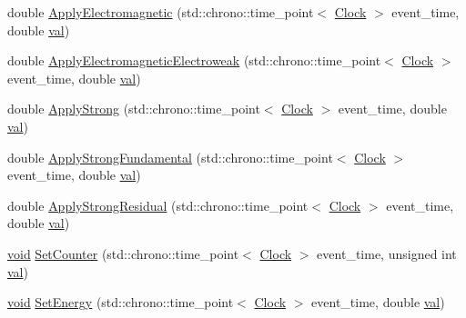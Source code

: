 \begin{DoxyCompactItemize}
\item 
double \mbox{\hyperlink{class_elementary_force_a0045a3380e468c6cfdbefce829888c1f}{Apply\+Electromagnetic}} (std\+::chrono\+::time\+\_\+point$<$ \mbox{\hyperlink{universe_8h_a0ef8d951d1ca5ab3cfaf7ab4c7a6fd80}{Clock}} $>$ event\+\_\+time, double \mbox{\hyperlink{glad_8h_a26942fd2ed566ef553eae82d2c109c8f}{val}})
\item 
double \mbox{\hyperlink{class_elementary_force_a3764a27b11760b6ead2c8a23ff25d77a}{Apply\+Electromagnetic\+Electroweak}} (std\+::chrono\+::time\+\_\+point$<$ \mbox{\hyperlink{universe_8h_a0ef8d951d1ca5ab3cfaf7ab4c7a6fd80}{Clock}} $>$ event\+\_\+time, double \mbox{\hyperlink{glad_8h_a26942fd2ed566ef553eae82d2c109c8f}{val}})
\item 
double \mbox{\hyperlink{class_elementary_force_a8a16bff6b5df2b0ff918262bf6376ade}{Apply\+Strong}} (std\+::chrono\+::time\+\_\+point$<$ \mbox{\hyperlink{universe_8h_a0ef8d951d1ca5ab3cfaf7ab4c7a6fd80}{Clock}} $>$ event\+\_\+time, double \mbox{\hyperlink{glad_8h_a26942fd2ed566ef553eae82d2c109c8f}{val}})
\item 
double \mbox{\hyperlink{class_elementary_force_a80f1977e777aa0c8cce2124b666e6446}{Apply\+Strong\+Fundamental}} (std\+::chrono\+::time\+\_\+point$<$ \mbox{\hyperlink{universe_8h_a0ef8d951d1ca5ab3cfaf7ab4c7a6fd80}{Clock}} $>$ event\+\_\+time, double \mbox{\hyperlink{glad_8h_a26942fd2ed566ef553eae82d2c109c8f}{val}})
\item 
double \mbox{\hyperlink{class_elementary_force_a185dc4e0b840505df27dbbed9fdcdc7b}{Apply\+Strong\+Residual}} (std\+::chrono\+::time\+\_\+point$<$ \mbox{\hyperlink{universe_8h_a0ef8d951d1ca5ab3cfaf7ab4c7a6fd80}{Clock}} $>$ event\+\_\+time, double \mbox{\hyperlink{glad_8h_a26942fd2ed566ef553eae82d2c109c8f}{val}})
\item 
\mbox{\hyperlink{glad_8h_a950fc91edb4504f62f1c577bf4727c29}{void}} \mbox{\hyperlink{class_elementary_force_a3762cf66ed266b310446417215dec3fa}{Set\+Counter}} (std\+::chrono\+::time\+\_\+point$<$ \mbox{\hyperlink{universe_8h_a0ef8d951d1ca5ab3cfaf7ab4c7a6fd80}{Clock}} $>$ event\+\_\+time, unsigned int \mbox{\hyperlink{glad_8h_a26942fd2ed566ef553eae82d2c109c8f}{val}})
\item 
\mbox{\hyperlink{glad_8h_a950fc91edb4504f62f1c577bf4727c29}{void}} \mbox{\hyperlink{class_elementary_force_a466c84ee4a50a29ef1f0fc6509ae3161}{Set\+Energy}} (std\+::chrono\+::time\+\_\+point$<$ \mbox{\hyperlink{universe_8h_a0ef8d951d1ca5ab3cfaf7ab4c7a6fd80}{Clock}} $>$ event\+\_\+time, double \mbox{\hyperlink{glad_8h_a26942fd2ed566ef553eae82d2c109c8f}{val}})

\end{DoxyCompactItemize}
